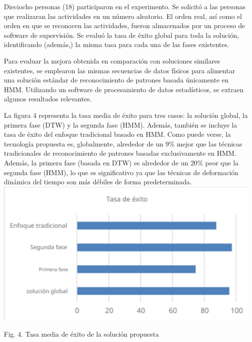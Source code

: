 \documentclass[10pt]{article}
\begin{document}
Dieciocho personas (18) participaron en el experimento. Se solicitó a las personas que realizaran las actividades en un número aleatorio. El orden real, así como el orden en que se reconocen las actividades, fueron almacenados por un proceso de software de supervisión. Se evaluó la tasa de éxito global para toda la solución, identificando (además,) la misma tasa para cada una de las fases existentes.
\newline

Para evaluar la mejora obtenida en comparación con soluciones similares existentes, se emplearon las mismas secuencias de datos físicos para alimentar una solución estándar de reconocimiento de patrones basada únicamente en HMM. Utilizando un software de procesamiento de datos estadísticos, se extraen algunos resultados relevantes.
\newline

La figura 4 representa la tasa media de éxito para tres casos: la solución global, la primera fase (DTW) y la segunda fase (HMM). Además, también se incluye la tasa de éxito del enfoque tradicional basado en HMM. Como puede verse, la tecnología propuesta es, globalmente, alrededor de un 9\% mejor que las técnicas tradicionales de reconocimiento de patrones basadas exclusivamente en HMM. Además, la primera fase (basada en DTW) es alrededor de un 20\% peor que la segunda fase (HMM), lo que es significativo ya que las técnicas de deformación dinámica del tiempo son más débiles de forma predeterminada.\\


\includegraphics[max width=\textwidth]{images/2022_09_15_69d89c46b49bb93649d1g-09}

Fig. 4. Tasa media de éxito de la solución propuesta
\end{document}
